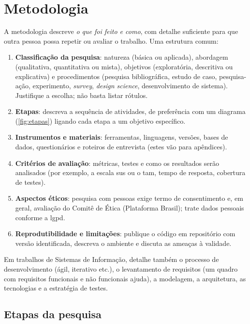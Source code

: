 \chapter{Metodologia}\label{sec:metodos}

\begin{dica}
A metodologia descreve \emph{o que foi feito e como}, com detalhe suficiente para que
outra pessoa possa repetir ou avaliar o trabalho. Uma estrutura comum:
\begin{enumerate}
  \item \textbf{Classificação da pesquisa}: natureza (básica ou aplicada), abordagem
        (qualitativa, quantitativa ou mista), objetivos (exploratória, descritiva ou
        explicativa) e procedimentos (pesquisa bibliográfica, estudo de caso, pesquisa-ação,
        experimento, \emph{survey}, \emph{design science}, desenvolvimento de sistema).
        Justifique a escolha; não basta listar rótulos.
  \item \textbf{Etapas}: descreva a sequência de atividades, de preferência com um
        diagrama (\autoref{fig:etapas}) ligando cada etapa a um objetivo específico.
  \item \textbf{Instrumentos e materiais}: ferramentas, linguagens, versões, bases de
        dados, questionários e roteiros de entrevista (estes vão para apêndices).
  \item \textbf{Critérios de avaliação}: métricas, testes e como os resultados serão
        analisados (por exemplo, a escala \ac{sus} ou o \ac{tam}, tempo de resposta,
        cobertura de testes).
  \item \textbf{Aspectos éticos}: pesquisa com pessoas exige termo de consentimento e,
        em geral, avaliação do Comitê de Ética (Plataforma Brasil); trate dados pessoais
        conforme a \ac{lgpd}.
  \item \textbf{Reprodutibilidade e limitações}: publique o código em repositório com
        versão identificada, descreva o ambiente e discuta as ameaças à validade.
\end{enumerate}
Em trabalhos de Sistemas de Informação, detalhe também o processo de desenvolvimento
(ágil, iterativo etc.), o levantamento de requisitos (um quadro com requisitos funcionais
e não funcionais ajuda), a modelagem, a arquitetura, as tecnologias e a estratégia de testes.
\end{dica}

\section{Etapas da pesquisa}

